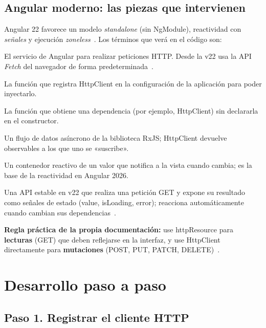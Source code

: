 \documentclass[11pt,a4paper]{article}
\newcommand{\code}[1]{{\ttfamily\color{ngdark}#1}}
\begin{document}
\subsection{Angular moderno: las piezas que intervienen}

Angular 22 favorece un modelo \emph{standalone} (sin \code{NgModule}), reactividad con \emph{señales} y ejecución \emph{zoneless}~\cite{angularv22}. Los términos que verá en el código son:

\begin{description}[leftmargin=1.2cm,style=nextline]
	\item[\code{HttpClient}] El servicio de Angular para realizar peticiones HTTP. Desde la v22 usa la API \emph{Fetch} del navegador de forma predeterminada~\cite{angularhttp}.
	\item[\code{provideHttpClient()}] La función que registra \code{HttpClient} en la configuración de la aplicación para poder inyectarlo.
	\item[\code{inject()}] La función que obtiene una dependencia (por ejemplo, \code{HttpClient}) sin declararla en el constructor.
	\item[\code{Observable}] Un flujo de datos asíncrono de la biblioteca RxJS; \code{HttpClient} devuelve observables a los que uno se «suscribe».
	\item[\code{signal}] Un contenedor reactivo de un valor que notifica a la vista cuando cambia; es la base de la reactividad en Angular 2026.
	\item[\code{httpResource()}] Una API estable en v22 que realiza una petición GET y expone su resultado como señales de estado (\code{value}, \code{isLoading}, \code{error}); reacciona automáticamente cuando cambian sus dependencias~\cite{angularhttpresource}.
\end{description}

\begin{nota}
	\textbf{Regla práctica de la propia documentación:} use \code{httpResource} para \textbf{lecturas} (GET) que deben reflejarse en la interfaz, y use \code{HttpClient} directamente para \textbf{mutaciones} (POST, PUT, PATCH, DELETE)~\cite{angularhttpresource}.
\end{nota}

\section{Desarrollo paso a paso}

\subsection*{Paso 1. Registrar el cliente HTTP}
\end{document}
